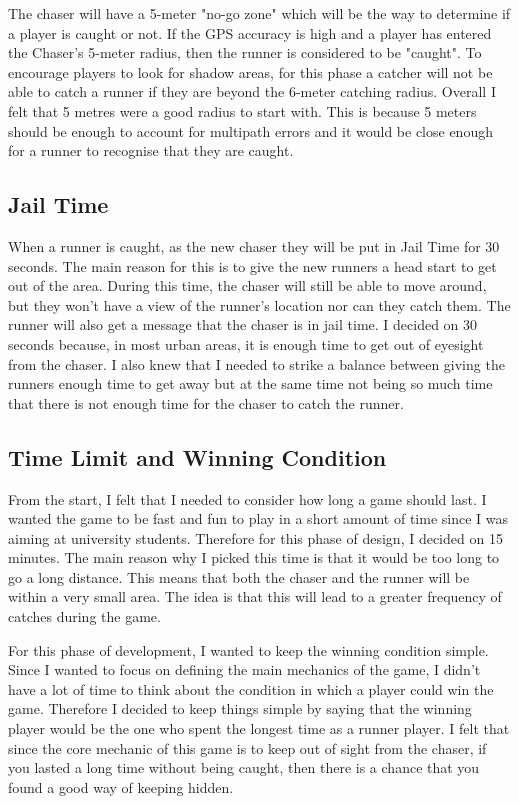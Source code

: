 \documentclass{l4proj}
\begin{document}
The chaser will have a 5-meter "no-go zone" which will be the way to determine if a player is caught or not. If
the GPS accuracy is high and a player has entered the Chaser's 5-meter radius, then the runner is considered to be 
"caught". To encourage players to look for shadow areas, for this phase a catcher will not be able to catch
a runner if they are beyond the 6-meter catching radius. Overall I felt that 5 metres were a good radius to 
start with. This is because 5 meters should be enough to account for multipath errors and it would be close enough
for a runner to recognise that they are caught.

\subsection{Jail Time}
When a runner is caught, as the new chaser they will be put in Jail Time for 30 seconds. The main reason for this is
to give the new runners a head start to get out of the area. During this time, the chaser will still be able to move
around, but they won't have a view of the runner's location nor can they catch them. The runner will also get a message
that the chaser is in jail time. I decided on 30 seconds because, in most urban areas, it is enough time to get out of
eyesight from the chaser. I also knew that I needed to strike a balance between giving the runners enough time to get
away but at the same time not being so much time that there is not enough time for the chaser to catch the runner. 

\subsection{Time Limit and Winning Condition}
From the start, I felt that I needed to consider how long a game should last. I wanted the game to be fast and fun to
play in a short amount of time since I was aiming at university students. Therefore for this phase of design, I decided
on 15 minutes. The main reason why I picked this time is that it would be too long to go a long distance.
This means that both the chaser and the runner will be within a very small area. The idea is that this will lead to
a greater frequency of catches during the game.

For this phase of development, I wanted to keep the winning condition simple. Since I wanted to focus on defining the
main mechanics of the game, I didn't have a lot of time to think about the condition in which a player could win the
game. Therefore I decided to keep things simple by saying that the winning player would be the one who spent the longest
time as a runner player. I felt that since the core mechanic of this game is to keep out of sight from the chaser, if you
lasted a long time without being caught, then there is a chance that you found a good way of keeping hidden.
\end{document}
